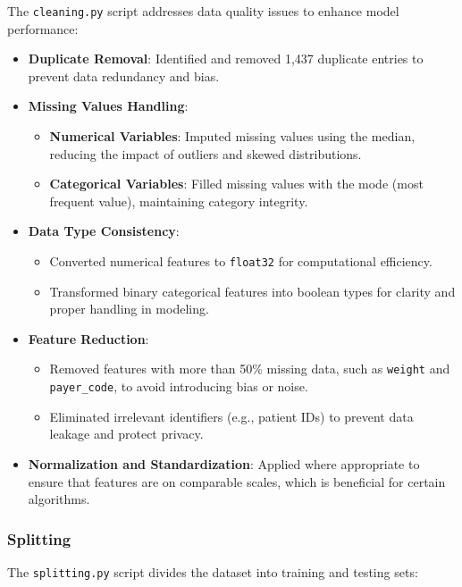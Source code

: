 \documentclass{article}
\begin{document}
The \texttt{cleaning.py} script addresses data quality issues to enhance model performance:

\begin{itemize}[leftmargin=*]
    \item \textbf{Duplicate Removal}: Identified and removed 1,437 duplicate entries to prevent data redundancy and bias.
    \item \textbf{Missing Values Handling}:
        \begin{itemize}[leftmargin=*]
            \item \textbf{Numerical Variables}: Imputed missing values using the median, reducing the impact of outliers and skewed distributions.
            \item \textbf{Categorical Variables}: Filled missing values with the mode (most frequent value), maintaining category integrity.
        \end{itemize}
    \item \textbf{Data Type Consistency}:
        \begin{itemize}[leftmargin=*]
            \item Converted numerical features to \texttt{float32} for computational efficiency.
            \item Transformed binary categorical features into boolean types for clarity and proper handling in modeling.
        \end{itemize}
    \item \textbf{Feature Reduction}:
        \begin{itemize}[leftmargin=*]
            \item Removed features with more than 50\% missing data, such as \texttt{weight} and \texttt{payer\_code}, to avoid introducing bias or noise.
            \item Eliminated irrelevant identifiers (e.g., patient IDs) to prevent data leakage and protect privacy.
        \end{itemize}
    \item \textbf{Normalization and Standardization}: Applied where appropriate to ensure that features are on comparable scales, which is beneficial for certain algorithms.
\end{itemize}

\subsubsection{Splitting}

The \texttt{splitting.py} script divides the dataset into training and testing sets:
\end{document}
